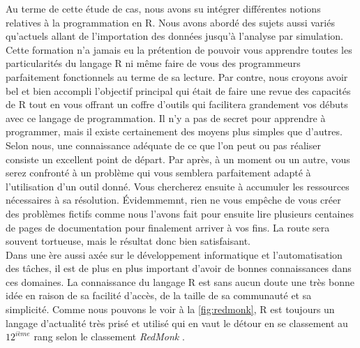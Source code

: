Au terme de cette étude de cas, nous avons su intégrer différentes notions relatives à la programmation en R. Nous avons abordé des sujets aussi variés qu'actuels allant de l'importation des données jusqu'à l'analyse par simulation. \\

Cette formation n'a jamais eu la prétention de pouvoir vous apprendre toutes les particularités du langage R ni même faire de vous des programmeurs parfaitement fonctionnels au terme de sa lecture. Par contre, nous croyons avoir bel et bien accompli l'objectif principal qui était de faire une revue des capacités de R tout en vous offrant un coffre d'outils qui facilitera grandement vos débuts avec ce langage de programmation. Il n'y a pas de secret pour apprendre à programmer, mais il existe certainement des moyens plus simples que d'autres. Selon nous, une connaissance adéquate de ce que l'on peut ou pas réaliser consiste un excellent point de départ. Par après, à un moment ou un autre, vous serez confronté à un problème qui vous semblera parfaitement adapté à l'utilisation d'un outil donné. Vous chercherez ensuite à accumuler les ressources nécessaires à sa résolution. Évidemmemnt, rien ne vous empêche de vous créer des problèmes fictifs comme nous l'avons fait pour ensuite lire plusieurs centaines de pages de documentation pour finalement arriver à vos fins. La route sera souvent tortueuse, mais le résultat donc bien satisfaisant. \\

Dans une ère aussi axée sur le développement informatique et l'automatisation des tâches, il est de plus en plus important d'avoir de bonnes connaissances dans ces domaines. La connaissance du langage R est sans aucun doute une très bonne idée en raison de sa facilité d'accès, de la taille de sa communauté et sa simplicité. Comme nous pouvons le voir à la \autoref{fig:redmonk}, R est toujours un langage d'actualité très prisé et utilisé qui en vaut le détour en se classement au $12^{ième}$ rang selon le classement \emph{RedMonk} \cite{codingGame}. \\


